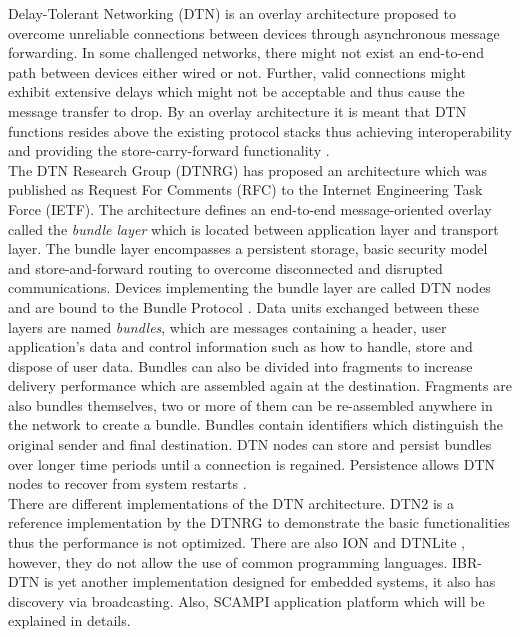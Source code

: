 Delay-Tolerant Networking (DTN) is an overlay architecture proposed to overcome unreliable connections between devices through asynchronous message forwarding. In some challenged networks, there might not exist an end-to-end path between devices either wired or not. Further, valid connections might exhibit extensive delays which might not be acceptable and thus cause the message transfer to drop. By an overlay architecture it is meant that DTN functions resides above the existing protocol stacks thus achieving interoperability and providing the store-carry-forward functionality \cite{Fall:2003:DNA:863955.863960}.\\

\noindent The DTN Research Group (DTNRG) has proposed an architecture which was published as Request For Comments (RFC) to the Internet Engineering Task Force (IETF). The architecture defines an end-to-end message-oriented overlay called the \textit{bundle layer} which is located  between  application layer and  transport layer. The bundle layer encompasses a persistent storage, basic security model and store-and-forward routing to overcome disconnected and disrupted communications. Devices implementing the bundle layer are called DTN nodes and are bound to the Bundle Protocol \cite{scott2007bundle}. Data units exchanged between these layers are named \textit{bundles},  which are messages containing a header, user application's data and control information such as how to handle, store and dispose of user data. Bundles can also be divided into fragments  to increase delivery performance which are assembled again at the destination. Fragments are also bundles themselves, two or more of them can be re-assembled anywhere in the network to create a bundle. Bundles contain identifiers which distinguish the original sender and final destination. DTN nodes can store and persist bundles over longer time periods until a connection is regained.  Persistence allows DTN nodes to recover from system restarts \cite{fall2007delay}.\\


\noindent There are different implementations of the DTN architecture. DTN2 \cite{demmer2005dtn2} is a reference implementation by the DTNRG to demonstrate the basic functionalities thus the performance is not optimized. There are also ION \cite{burleigh2006interplanetary} and DTNLite \cite{patra2003dtnlite}, however, they do not allow the use of common programming languages. IBR-DTN \cite{Doering:2008:IEI:1409985.1410008} is yet another implementation designed for embedded systems, it also has discovery via broadcasting. Also, SCAMPI application platform \cite{Karkkainen:2012:SAP:2348616.2348636}  which will be explained in details.




